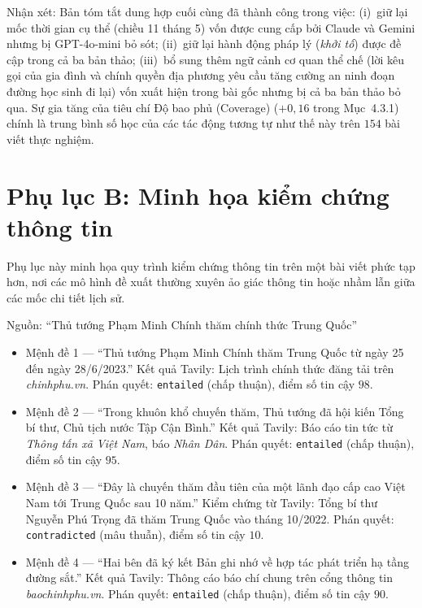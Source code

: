 Nhận xét: Bản tóm tắt dung hợp cuối cùng đã thành công trong việc: (i)~giữ lại mốc thời gian cụ thể (chiều 11 tháng 5) vốn được cung cấp bởi Claude và Gemini nhưng bị GPT-4o-mini bỏ sót; (ii)~giữ lại hành động pháp lý (\textit{khởi tố}) được đề cập trong cả ba bản thảo; (iii)~bổ sung thêm ngữ cảnh cơ quan thể chế (lời kêu gọi của gia đình và chính quyền địa phương yêu cầu tăng cường an ninh đoạn đường học sinh đi lại) vốn xuất hiện trong bài gốc nhưng bị cả ba bản thảo bỏ qua. Sự gia tăng của tiêu chí Độ bao phủ (Coverage) ($+0,16$ trong Mục~4.3.1) chính là trung bình số học của các tác động tương tự như thế này trên $154$ bài viết thực nghiệm.

\section*{Phụ lục B: Minh họa kiểm chứng thông tin}

Phụ lục này minh họa quy trình kiểm chứng thông tin trên một bài viết phức tạp hơn, nơi các mô hình đề xuất thường xuyên ảo giác thông tin hoặc nhầm lẫn giữa các mốc chi tiết lịch sử.

Nguồn: ``Thủ tướng Phạm Minh Chính thăm chính thức Trung Quốc''

\begin{itemize}
  \item Mệnh đề 1 --- ``Thủ tướng Phạm Minh Chính thăm Trung Quốc từ ngày 25 đến ngày 28/6/2023.''
        Kết quả Tavily: Lịch trình chính thức đăng tải trên \textit{chinhphu.vn}. Phán quyết: \texttt{entailed} (chấp thuận), điểm số tin cậy $98$.
  \item Mệnh đề 2 --- ``Trong khuôn khổ chuyến thăm, Thủ tướng đã hội kiến Tổng bí thư, Chủ tịch nước Tập Cận Bình.''
        Kết quả Tavily: Báo cáo tin tức từ \textit{Thông tấn xã Việt Nam}, báo \textit{Nhân Dân}. Phán quyết: \texttt{entailed} (chấp thuận), điểm số tin cậy $95$.
  \item Mệnh đề 3 --- ``Đây là chuyến thăm đầu tiên của một lãnh đạo cấp cao Việt Nam tới Trung Quốc sau 10 năm.''
        Kiểm chứng từ Tavily: Tổng bí thư Nguyễn Phú Trọng đã thăm Trung Quốc vào tháng 10/2022. Phán quyết: \texttt{contradicted} (mâu thuẫn), điểm số tin cậy $10$.
  \item Mệnh đề 4 --- ``Hai bên đã ký kết Bản ghi nhớ về hợp tác phát triển hạ tầng đường sắt.''
        Kết quả Tavily: Thông cáo báo chí chung trên cổng thông tin \textit{baochinhphu.vn}. Phán quyết: \texttt{entailed} (chấp thuận), điểm số tin cậy $90$.
\end{itemize}

